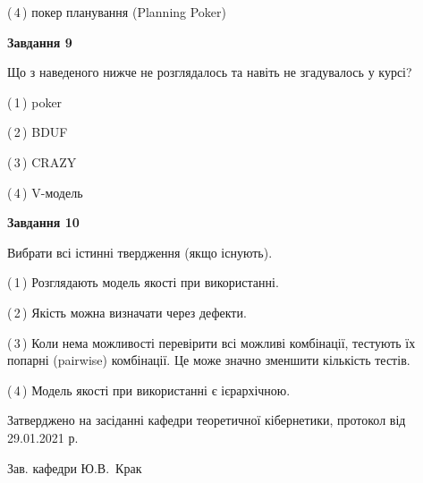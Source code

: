 \documentclass[10pt, ukrainian]{article}
\begin{document}
{\begin {large}
(\,4\,) покер планування (Planning Poker)%


{\begin {center}\textbf{Завдання 9}\end {center}}\par
Що з наведеного нижче не розглядалось та навіть не згадувалось у курсі?\par
\vspace{2mm}



(\,1\,) poker%



(\,2\,) BDUF%



(\,3\,) CRAZY%



(\,4\,) V-модель%


{\begin {center}\textbf{Завдання 10}\end {center}}\par
Вибрати всі істинні твердження (якщо існують).\par
\vspace{2mm}



(\,1\,) Розглядають модель якості при використанні.%



(\,2\,) Якість можна визначати через дефекти.%



(\,3\,) Коли нема можливості перевірити всі можливі комбінації, тестують їх попарні (pairwise) комбінації. Це може значно зменшити кількість тестів.%



(\,4\,) Модель якості при використанні є ієрархічною.%



\end {large}}
{\vspace{5mm}\smallskip \begin {small} Затверджено на засіданні кафедри теоретичної кібернетики, протокол  від   29.01.2021 р.\par\smallskip\smallskip
{\parbox {6.5 cm}{Зав. кафедри \dotfill Ю.В.~Крак}} \end{small}}
\newpage
\end{document}

